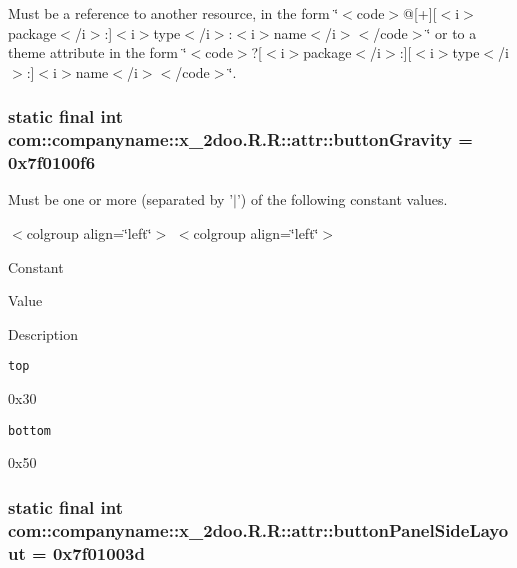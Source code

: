 Must be a reference to another resource, in the form \char`\"{}$<$code$>$@\mbox{[}+\mbox{]}\mbox{[}$<$i$>$package$<$/i$>$:\mbox{]}$<$i$>$type$<$/i$>$:$<$i$>$name$<$/i$>$$<$/code$>$\char`\"{} or to a theme attribute in the form \char`\"{}$<$code$>$?\mbox{[}$<$i$>$package$<$/i$>$:\mbox{]}\mbox{[}$<$i$>$type$<$/i$>$:\mbox{]}$<$i$>$name$<$/i$>$$<$/code$>$\char`\"{}. \hypertarget{classcom_1_1companyname_1_1x__2doo_1_1_r_1_1attr_1cedb514b5a3dc058a1bffef0391db7a}{
\subsubsection[{buttonGravity}]{\setlength{\rightskip}{0pt plus 5cm}static final int com::companyname::x\_\-2doo.R.R::attr::buttonGravity = 0x7f0100f6}}
\label{classcom_1_1companyname_1_1x__2doo_1_1_r_1_1attr_1cedb514b5a3dc058a1bffef0391db7a}


Must be one or more (separated by '$|$') of the following constant values. \begin{TabularC}{0}
\hline
\end{TabularC}
$<$colgroup align=\char`\"{}left\char`\"{}$>$ $<$colgroup align=\char`\"{}left\char`\"{}$>$ 

Constant

Value

Description 

{\tt top}

0x30

{\tt bottom}

0x50\hypertarget{classcom_1_1companyname_1_1x__2doo_1_1_r_1_1attr_1a453c35f817208e0bb82240ce06904f}{
\subsubsection[{buttonPanelSideLayout}]{\setlength{\rightskip}{0pt plus 5cm}static final int com::companyname::x\_\-2doo.R.R::attr::buttonPanelSideLayout = 0x7f01003d}}
\label{classcom_1_1companyname_1_1x__2doo_1_1_r_1_1attr_1a453c35f817208e0bb82240ce06904f}


